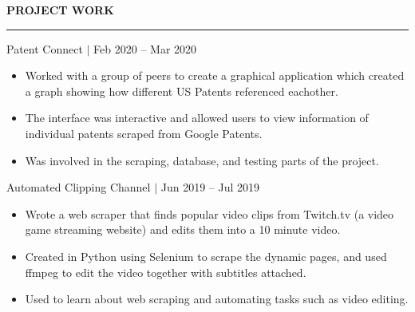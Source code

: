 \documentclass[12pt]{article}
\newcommand{\sectionRule}{\textcolor{gray}{\rule{7.27in}{0.02cm}}}
\newcommand{\sectionTxt}[1]{\noindent\textbf{#1}\\}
\newcommand{\projText}[2]{\noindent#1 $|$ {\color{textGray} #2}}
\begin{document}
    \sectionTxt{PROJECT WORK}
    \sectionRule


    \projText{Patent Connect}{Feb 2020 -- Mar 2020}
    \begin{small}
        \begin{itemize}
            \itemsep0em 
            
            \item {\color{textGray} Worked with a group of peers to create a graphical application which created a graph showing how different US Patents referenced eachother.}
            \item {\color{textGray} The interface was interactive and allowed users to view information of individual patents scraped from Google Patents.}
            \item {\color{textGray} Was involved in the scraping, database, and testing parts of the project.}
        \end{itemize}
    \end{small}
    \projText{Automated Clipping Channel}{Jun 2019 -- Jul 2019}
    \begin{small}
        \begin{itemize}
            \itemsep0em 
            \item {\color{textGray} Wrote a web scraper that finds popular video clips from Twitch.tv (a video game streaming website) and edits them into a 10 minute video.}
            \item {\color{textGray} Created in Python using Selenium to scrape the dynamic pages, and used ffmpeg to edit the video together with subtitles attached.}
            \item {\color{textGray} Used to learn about web scraping and automating tasks such as video editing.}
        \end{itemize}
    \end{small}

    \medskip %
\end{document}
